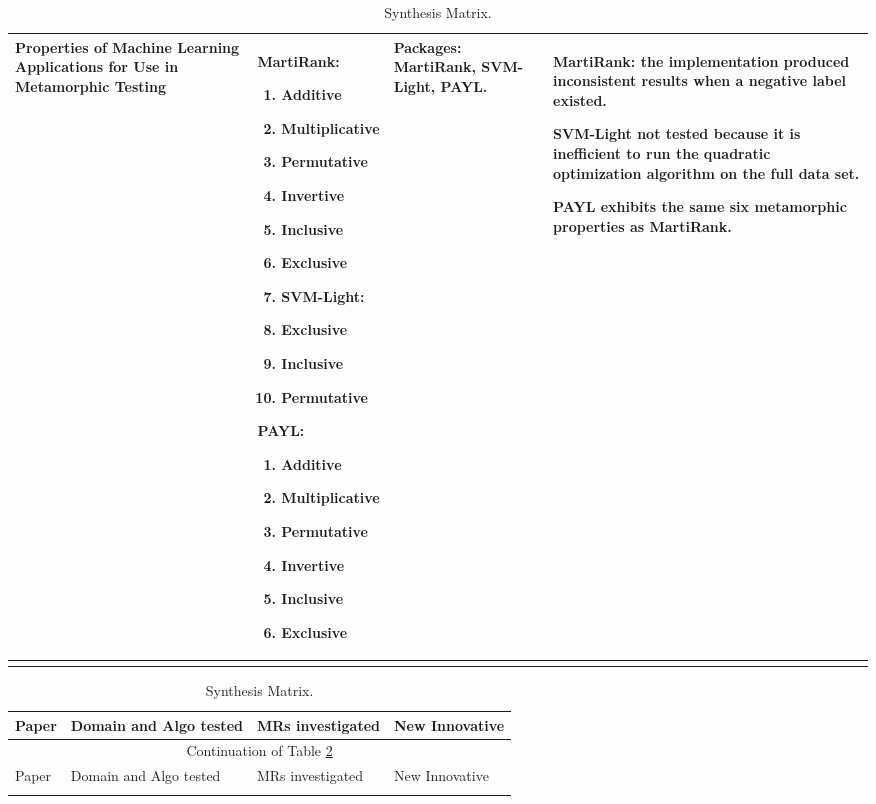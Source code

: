 \begin{singlespace}
\begin{longtable}[c]{| p{3cm} | p{5.5cm} | p{3cm} | p{3cm} |}
  Properties of Machine Learning Applications for Use in Metamorphic Testing &
  MartiRank:
  \begin{enumerate}
   \item Additive
   \item Multiplicative
   \item Permutative
   \item Invertive
   \item Inclusive
   \item Exclusive
   \item SVM-Light:
   \item Exclusive
   \item Inclusive
   \item Permutative
  \end{enumerate}
  \par\medskip
  PAYL:
  \begin{enumerate}
   \item Additive
   \item Multiplicative
   \item Permutative
   \item Invertive
   \item Inclusive
   \item Exclusive
  \end{enumerate}                                                  &
  Packages: MartiRank, SVM-Light, PAYL.                                      &
  MartiRank: the implementation produced inconsistent results when a negative label existed.\par\medskip
  SVM-Light not tested because it is inefficient to run the quadratic optimization algorithm on the full data set.\par\medskip
  PAYL exhibits the same six metamorphic properties as MartiRank.                                                              \\

  \hline

  \caption{Synthesis Matrix.\label{long}}
 \end{longtable}

 \begin{longtable}[c]{| p{3cm} | p{4cm} | p{3.5cm} | p{4cm} |}
  \hline

  Paper & Domain and Algo tested  & MRs investigated & New Innovative \\
  \hline
  \endfirsthead
  \hline
  \multicolumn{4}{|c|}{Continuation of Table \ref{long}}                                                                       \\
  \hline
  Paper & Domain and Algo tested  & MRs investigated & New Innovative \\
  \hline
  \endhead
  \caption{Synthesis Matrix.\label{long}}
  \endfoot


\end{longtable}
\end{singlespace}
